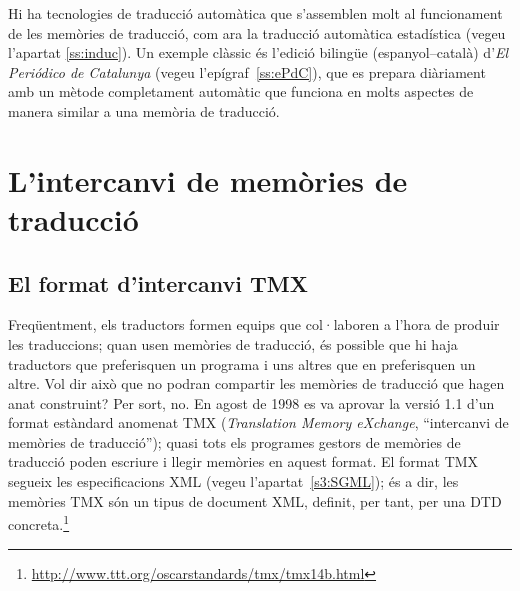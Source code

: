 Hi ha tecnologies de traducció automàtica que s'assemblen molt al
funcionament de les memòries de traducció, com ara la traducció
automàtica estadística (vegeu l'apartat \ref{ss:induc}). Un exemple
clàssic és l'edició bilingüe (espanyol--català) d'\emph{El Periódico
  de Catalunya} (vegeu l'epígraf~\ref{ss:ePdC}), que es prepara
diàriament amb un mètode completament automàtic que funciona en molts
aspectes de manera similar a una memòria de traducció.



\section{L'intercanvi de memòries de traducció}

\subsection{El format d'intercanvi TMX}


Freqüentment, els traductors formen equips que col·laboren a l'hora de
produir les traduccions; quan usen memòries de traducció, és possible
que hi haja traductors que preferisquen un programa i uns altres que
en preferisquen un altre. Vol dir això que no podran compartir les
memòries de traducció que hagen anat construint? Per sort, no. En
agost de 1998 es va aprovar la versió 1.1 d'un format estàndard
anomenat TMX (\emph{Translation Memory eXchange}, ``intercanvi de
memòries de traducció''); quasi tots els programes gestors de memòries
de traducció poden escriure i llegir memòries en aquest format.  El
format TMX segueix les especificacions XML (vegeu
l'apartat~\ref{s3:SGML}); és a dir, les memòries TMX són un tipus de
document XML, definit, per tant, per una DTD concreta.\footnote{\url{http://www.ttt.org/oscarstandards/tmx/tmx14b.html}}

